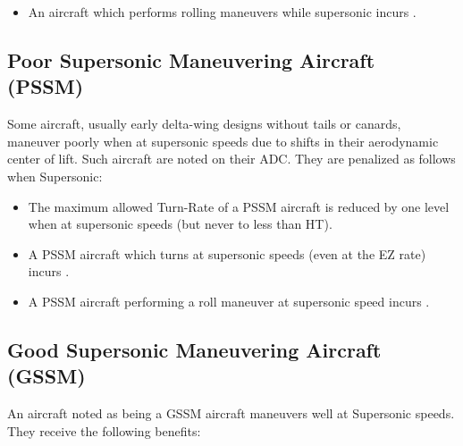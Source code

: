 \begin{advancedrules}
\begin{itemize}
        \item An aircraft which performs rolling maneuvers while supersonic incurs .

    \end{itemize}


    \subsection{Poor Supersonic Maneuvering Aircraft (PSSM)} Some aircraft, usually early delta-wing designs without tails or canards, maneuver poorly when at supersonic speeds due to shifts in their aerodynamic center of lift.  Such aircraft are noted on their ADC. They are penalized as follows when Supersonic:

    \begin{itemize}

        \item
            The maximum allowed Turn-Rate of a PSSM aircraft is reduced by one level when at supersonic speeds (but never to less than HT).

        \item
            A PSSM aircraft which turns at supersonic speeds (even at the EZ rate) incurs .

        \item
            A PSSM aircraft performing a roll maneuver at supersonic speed incurs .

    \end{itemize}

    \subsection{Good Supersonic Maneuvering Aircraft (GSSM)} An aircraft noted as being a GSSM aircraft maneuvers well at Supersonic speeds. They receive the following benefits:


\end{advancedrules}
